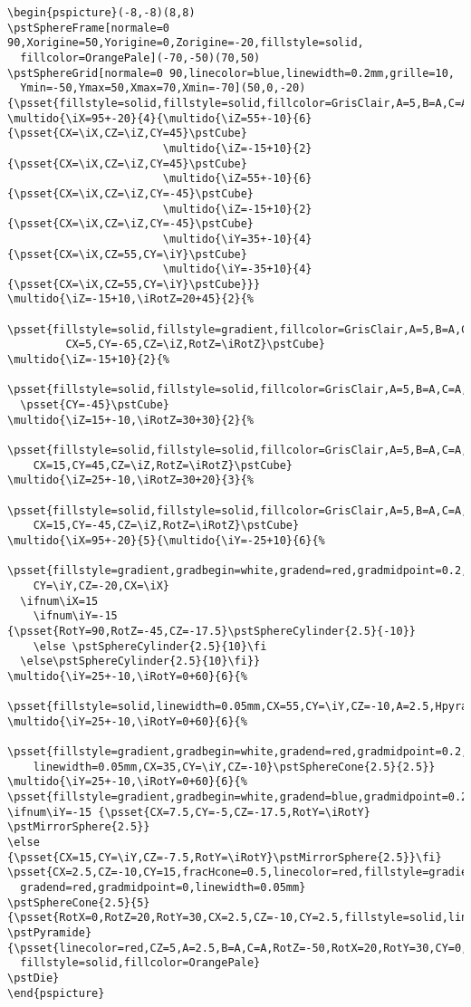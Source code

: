 \documentclass[11pt,frenchb,BCOR10mm,DIV12,bibliography=totoc,parskip=false,smallheadings
    headexclude,footexclude,oneside]{pst-doc}
\begin{document}
\begin{lstlisting}
\begin{pspicture}(-8,-8)(8,8)
\pstSphereFrame[normale=0 90,Xorigine=50,Yorigine=0,Zorigine=-20,fillstyle=solid,
  fillcolor=OrangePale](-70,-50)(70,50)
\pstSphereGrid[normale=0 90,linecolor=blue,linewidth=0.2mm,grille=10,
  Ymin=-50,Ymax=50,Xmax=70,Xmin=-70](50,0,-20)
{\psset{fillstyle=solid,fillstyle=solid,fillcolor=GrisClair,A=5,B=A,C=A}
\multido{\iX=95+-20}{4}{\multido{\iZ=55+-10}{6}{\psset{CX=\iX,CZ=\iZ,CY=45}\pstCube}
                        \multido{\iZ=-15+10}{2}{\psset{CX=\iX,CZ=\iZ,CY=45}\pstCube}
                        \multido{\iZ=55+-10}{6}{\psset{CX=\iX,CZ=\iZ,CY=-45}\pstCube}
                        \multido{\iZ=-15+10}{2}{\psset{CX=\iX,CZ=\iZ,CY=-45}\pstCube}
                        \multido{\iY=35+-10}{4}{\psset{CX=\iX,CZ=55,CY=\iY}\pstCube}
                        \multido{\iY=-35+10}{4}{\psset{CX=\iX,CZ=55,CY=\iY}\pstCube}}}
\multido{\iZ=-15+10,\iRotZ=20+45}{2}{%
  \psset{fillstyle=solid,fillstyle=gradient,fillcolor=GrisClair,A=5,B=A,C=A,
         CX=5,CY=-65,CZ=\iZ,RotZ=\iRotZ}\pstCube}
\multido{\iZ=-15+10}{2}{%
  \psset{fillstyle=solid,fillstyle=solid,fillcolor=GrisClair,A=5,B=A,C=A,CX=15,CY=45,CZ=\iZ}\pstCube
  \psset{CY=-45}\pstCube}
\multido{\iZ=15+-10,\iRotZ=30+30}{2}{%
  \psset{fillstyle=solid,fillstyle=solid,fillcolor=GrisClair,A=5,B=A,C=A,
    CX=15,CY=45,CZ=\iZ,RotZ=\iRotZ}\pstCube}
\multido{\iZ=25+-10,\iRotZ=30+20}{3}{%
  \psset{fillstyle=solid,fillstyle=solid,fillcolor=GrisClair,A=5,B=A,C=A,
    CX=15,CY=-45,CZ=\iZ,RotZ=\iRotZ}\pstCube}
\multido{\iX=95+-20}{5}{\multido{\iY=-25+10}{6}{%
  \psset{fillstyle=gradient,gradbegin=white,gradend=red,gradmidpoint=0.2,linewidth=0.05mm,
    CY=\iY,CZ=-20,CX=\iX}
  \ifnum\iX=15
    \ifnum\iY=-15 {\psset{RotY=90,RotZ=-45,CZ=-17.5}\pstSphereCylinder{2.5}{-10}}
    \else \pstSphereCylinder{2.5}{10}\fi
  \else\pstSphereCylinder{2.5}{10}\fi}}
\multido{\iY=25+-10,\iRotY=0+60}{6}{%
  \psset{fillstyle=solid,linewidth=0.05mm,CX=55,CY=\iY,CZ=-10,A=2.5,Hpyramide=5}\pstPyramide}
\multido{\iY=25+-10,\iRotY=0+60}{6}{%
  \psset{fillstyle=gradient,gradbegin=white,gradend=red,gradmidpoint=0.2,
    linewidth=0.05mm,CX=35,CY=\iY,CZ=-10}\pstSphereCone{2.5}{2.5}}
\multido{\iY=25+-10,\iRotY=0+60}{6}{%
\psset{fillstyle=gradient,gradbegin=white,gradend=blue,gradmidpoint=0.2,linecolor=cyan,linewidth=0.1mm}
\ifnum\iY=-15 {\psset{CX=7.5,CY=-5,CZ=-17.5,RotY=\iRotY} \pstMirrorSphere{2.5}}
\else {\psset{CX=15,CY=\iY,CZ=-7.5,RotY=\iRotY}\pstMirrorSphere{2.5}}\fi}
\psset{CX=2.5,CZ=-10,CY=15,fracHcone=0.5,linecolor=red,fillstyle=gradient,gradbegin=yellow,
  gradend=red,gradmidpoint=0,linewidth=0.05mm}
\pstSphereCone{2.5}{5}
{\psset{RotX=0,RotZ=20,RotY=30,CX=2.5,CZ=-10,CY=2.5,fillstyle=solid,linecolor=black,A=2,Hpyramide=3}
\pstPyramide}
{\psset{linecolor=red,CZ=5,A=2.5,B=A,C=A,RotZ=-50,RotX=20,RotY=30,CY=0,CX=20,%
  fillstyle=solid,fillcolor=OrangePale}
\pstDie}
\end{pspicture}
\end{lstlisting}
\end{document}
